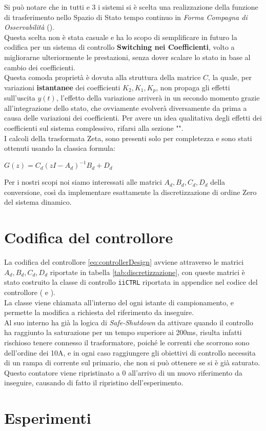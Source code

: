 \noindent
Si può notare che in tutti e 3 i sistemi si è scelta una realizzazione della funzione di trasferimento nello Spazio di Stato tempo continuo in \textit{Forma Compagna di Osservabilità} (\cite{FormeCanoniche}).\\
Questa scelta non è stata casuale e ha lo scopo di semplificare in futuro la codifica per un sistema di controllo \textbf{Switching nei Coefficienti}, volto a migliorarne ulteriormente le prestazioni, senza dover scalare lo stato in base al cambio dei coefficienti.\\
Questa comoda proprietà è dovuta alla struttura della matrice $ C $, la quale, per variazioni \textbf{istantanee} dei coefficienti $ K_2,K_1,K_p$, non propaga gli effetti sull'uscita $ y(t) $, l'effetto della variazione arriverà in un secondo momento grazie all'integrazione dello stato, che ovviamente evolverà diversamente da prima a causa delle variazioni dei coefficienti. Per avere un idea qualitativa degli effetti dei coefficienti sul sistema complessivo, rifarsi alla sezione "".\\
I calcoli della trasformata Zeta, sono presenti solo per completezza e sono stati ottenuti usando la classica formula:\vspace{-5mm}
\begin{center}
{\Large 		$ G(z) = C_d \left(z I - A_d\right)^{-1} B_d + D_d $}
\end{center}
\noindent
Per i nostri scopi noi siamo interessati alle matrici $ A_d,B_d,C_d,D_d $ della conversione, così da implementare esattamente la discretizzazione di ordine Zero del sistema dinamico.\\


\section{Codifica del controllore}
La codifica del controllore \ref{eq:controllerDesign} avviene attraverso le matrici $ A_d,B_d,C_d,D_d $ riportate in tabella \ref{tab:discretizzazione}, con queste matrici è stato costruito la classe di controllo \verb|iiCTRL| riportata in appendice nel codice del controllore ( e ).\\
La classe viene chiamata all'interno del  ogni istante di campionamento, e permette la modifica a richiesta del riferimento da inseguire.\\
Al suo interno ha già la logica di \textit{Safe-Shutdown} da attivare quando il controllo ha raggiunto la saturazione per un tempo superiore ai 200ms, risulta infatti rischioso tenere connesso il trasformatore, poiché le correnti che scorrono sono dell'ordine dei 10A, e in ogni caso raggiungere gli obiettivi di controllo necessita di un rampa di corrente sul primario, che non si può ottenere se si è già saturato.\\
Questo contatore viene ripristinato a 0 all'arrivo di un nuovo riferimento da inseguire, causando di fatto il ripristino dell'esperimento.\\

\section{Esperimenti}

